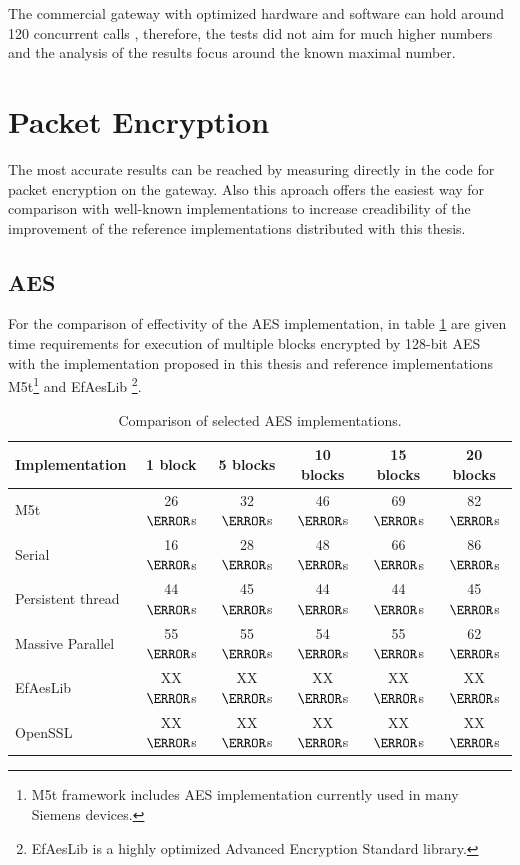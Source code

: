 The commercial gateway with optimized hardware and software can hold around 120 
concurrent calls \cite{hp4k}, therefore, the tests did not aim for much higher
numbers and the analysis of the results focus around the known maximal number. 

\section{Packet Encryption}
The most accurate results can be reached by measuring directly in the code for
packet encryption on the gateway. Also this aproach offers the easiest way
for comparison with well-known implementations to increase creadibility of 
the improvement of the reference implementations distributed with this thesis. 

\subsection*{AES}
For the comparison of effectivity of the AES implementation, in table 
\ref{aes-comparison} are given time requirements for execution of multiple
blocks encrypted by 128-bit AES with the implementation proposed in this thesis
and reference implementations M5t\footnote{ M5t framework includes AES 
implementation currently used in many Siemens devices\cite{m5t}.} and EfAesLib 
\footnote{ EfAesLib is a highly optimized Advanced Encryption Standard 
library\cite{aes-lib}.}.
\begin{table}[H]
\begin{center}
\begin{tabular}{|l|ccccc|}\hline%
Implementation &  1 block & 5 blocks & 10 blocks & 15 blocks & 20 blocks\\\hline
M5t  &26 $\micro$s&32 $\micro$s&46 $\micro$s&69 $\micro$s&82 $\micro$s\\ 
Serial  &16 $\micro$s&28 $\micro$s&48 $\micro$s&66 $\micro$s&86 $\micro$s\\
Persistent thread&44 $\micro$s&45 $\micro$s&44 $\micro$s&44 $\micro$s&45 $\micro$s\\
Massive Parallel&55 $\micro$s&55 $\micro$s&54 $\micro$s&55 $\micro$s&62 $\micro$s\\
EfAesLib &XX $\micro$s&XX $\micro$s&XX $\micro$s&XX $\micro$s&XX $\micro$s\\
OpenSSL &XX $\micro$s&XX $\micro$s&XX $\micro$s&XX $\micro$s&XX $\micro$s\\\hline
\end{tabular}
\end{center}
\caption{Comparison of selected AES implementations.}
\label{aes-comparison}
\end{table}

